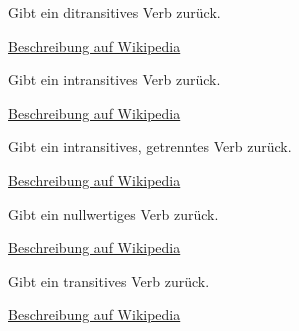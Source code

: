 \documentclass[a4paper,12pt,oneside]{sphinxmanual}
\begin{document}
\begin{fulllineitems}
\label{funktionen:pyzufall.verbd}
Gibt ein ditransitives Verb zurück.

\href{http://de.wikipedia.org/wiki/Transitivität\_(Grammatik)\#Festlegung\_der\_Transitivit.C3.A4t\_eines\_Verbs/}{Beschreibung auf Wikipedia}

\end{fulllineitems}


\begin{fulllineitems}
\label{funktionen:pyzufall.verbi}
Gibt ein intransitives Verb zurück.

\href{http://de.wikipedia.org/wiki/Transitivität\_(Grammatik)\#Festlegung\_der\_Transitivit.C3.A4t\_eines\_Verbs/}{Beschreibung auf Wikipedia}

\end{fulllineitems}


\begin{fulllineitems}
\label{funktionen:pyzufall.verbi2}
Gibt ein intransitives, getrenntes Verb zurück.

\href{http://de.wikipedia.org/wiki/Transitivität\_(Grammatik)\#Festlegung\_der\_Transitivit.C3.A4t\_eines\_Verbs/}{Beschreibung auf Wikipedia}

\end{fulllineitems}


\begin{fulllineitems}
\label{funktionen:pyzufall.verbn}
Gibt ein nullwertiges Verb zurück.

\href{http://de.wikipedia.org/wiki/Transitivität\_(Grammatik)\#Festlegung\_der\_Transitivit.C3.A4t\_eines\_Verbs/}{Beschreibung auf Wikipedia}

\end{fulllineitems}


\begin{fulllineitems}
\label{funktionen:pyzufall.verbt}
Gibt ein transitives Verb zurück.

\href{http://de.wikipedia.org/wiki/Transitivität\_(Grammatik)\#Festlegung\_der\_Transitivit.C3.A4t\_eines\_Verbs/}{Beschreibung auf Wikipedia}

\end{fulllineitems}
\end{document}
